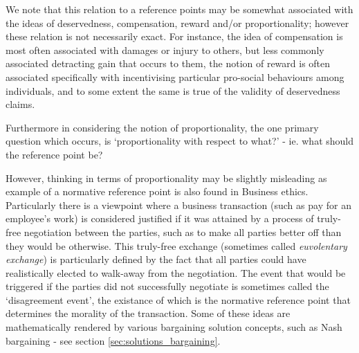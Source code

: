 We note that this relation to a reference points may be somewhat associated with the ideas of deservedness, compensation, reward and/or proportionality; however these relation is not necessarily exact.
For instance, the idea of compensation is most often associated with damages or injury to others, but less commonly associated detracting gain that occurs to them, the notion of reward is often associated specifically with incentivising particular pro-social behaviours among individuals, and to some extent the same is true of the validity of deservedness claims.

Furthermore in considering the notion of proportionality, the one primary question which occurs, is `proportionality with respect to what?' - ie. what should the reference point be?

However, thinking in terms of proportionality may be slightly misleading as example of a normative reference point is also found in Business ethics.
Particularly there is a viewpoint where a business transaction (such as pay for an employee's work) is considered justified if it was attained by a process of truly-free negotiation between the parties, such as to make all parties better off than they would be otherwise.\cite{ExecutiveCompensationUnjustorJustRight} 
This truly-free exchange (sometimes called \textit{euvolentary exchange}) is particularly defined by the fact that all parties could have realistically elected to walk-away from the negotiation.\cite{Guzman2019}
The event that would be triggered if the parties did not successfully negotiate is sometimes called the `disagreement event', the existance of which is the normative reference point that determines the morality of the transaction.
Some of these ideas are mathematically rendered by various bargaining solution concepts, such as Nash bargaining - see section \ref{sec:solutions_bargaining}.

